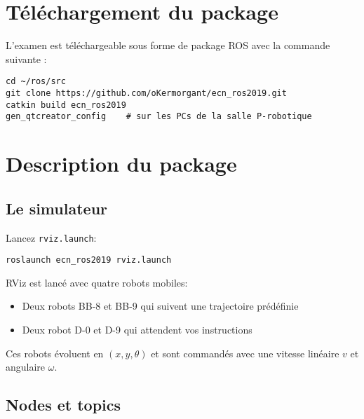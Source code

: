 \documentclass{ecnreport}
\begin{document}




\section{Téléchargement du package}

L'examen est téléchargeable sous forme de package ROS avec la commande suivante : 
\begin{center}
\begin{lstlisting}
cd ~/ros/src
git clone https://github.com/oKermorgant/ecn_ros2019.git
catkin build ecn_ros2019
gen_qtcreator_config    # sur les PCs de la salle P-robotique
\end{lstlisting}
\end{center}

\section{Description du package}

\subsection{Le simulateur}

Lancez \texttt{rviz.launch}:
\begin{center}
\begin{lstlisting}
roslaunch ecn_ros2019 rviz.launch
\end{lstlisting}
\end{center}

\def\w{\omega}

RViz est lancé avec quatre robots mobiles:
\begin{itemize}
 \item Deux robots BB-8 et BB-9 qui suivent une trajectoire prédéfinie
 \item Deux robot D-0 et D-9 qui attendent vos instructions
\end{itemize}Ces robots évoluent en $(x,y,\theta)$ et sont commandés avec une vitesse linéaire $v$ et angulaire $\w$.

\subsection{Nodes et topics}
\end{document}
